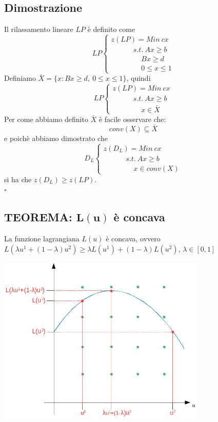 \subsection{Dimostrazione}
Il rilassamento lineare $LP$ è definito come
\begin{equation*}
	LP
	\begin{cases}
		z(LP)=Min\ cx \\
		\ \ \ \ \ \ \ \ \ \ \ \ \ \ s.t.\ Ax\ge b \\
		\ \ \ \ \ \ \ \ \ \ \ \ \ \ \ \ \ \ \ Bx\ge d \\
		\ \ \ \ \ \ \ \ \ \ \ \ \ \ \ \ \ \ \ 0\le x\le 1
	\end{cases}
\end{equation*}
Definiamo $\bar{X}=\{x:Bx\ge d,\ 0\le x\le 1\}$, quindi
\begin{equation*}
	LP
	\begin{cases}
		z(LP)=Min\ cx \\
		\ \ \ \ \ \ \ \ \ \ \ \ \ s.t.\ Ax\ge b\\
		\ \ \ \ \ \ \ \ \ \ \ \ \ \ \ \ \ \ x\in\bar{X}
	\end{cases}
\end{equation*}
Per come abbiamo definito $\bar{X}$ è facile osservare che:
\begin{equation*}
	conv(X)\subseteq\bar{X}
\end{equation*}
e poichè abbiamo dimostrato che
\begin{equation*}
	D_{L}
	\begin{cases}
		z(D_{L})=Min\ cx\\
		\ \ \ \ \ \ \ \ \ \ \ \ \ \ s.t.\ Ax\ge b \\
		\ \ \ \ \ \ \ \ \ \ \ \ \ \ \ \ \ \ \ x\in conv(X)
	\end{cases}
\end{equation*}
si ha che $z(D_{L})\ge z(LP)$.\\
$\square$

\clearpage
\subsection{TEOREMA: $\boldsymbol{L(u)}$ è concava}
La funzione lagrangiana $L(u)$ è concava, ovvero $L(\lambda u^{1}+(1-\lambda)u^{2})\ge \lambda L(u^{1})+(1-\lambda)L(u^{2})$, $\lambda \in [0,1]$

\centerline{\includegraphics[height=8cm]{images/graph28.png}}

